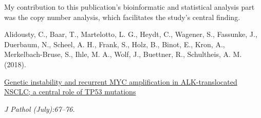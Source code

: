 \enlargethispage{\baselineskip}

\vfill
\noindent My contribution to this publication's bioinformatic and statistical
analysis part was the copy number analysis, which facilitates the study's
central finding.\nopagebreak
\medskip
\begin{tcolorbox}[
  boxrule=0pt, leftrule=1pt, colframe=s-blue, colback=white, sharp corners=all]%
  \raggedright
  Alidousty, C., Baar, T., Martelotto, L. G., Heydt, C., Wagener, S.,
  Fassunke, J., Duerbaum, N., Scheel, A. H., Frank, S., Holz, B., Binot, E.,
  Kron, A., Merkelbach-Bruse, S., Ihle, M. A., Wolf, J., Buettner, R.,
  Schultheis, A. M. (2018).
  
  \smallskip
  \href{http://doi.wiley.com/10.1002/path.5110}
    {Genetic instability and recurrent MYC amplification in ALK-translocated
    NSCLC; a central role of TP53 mutations}

  \smallskip
  \textit{J Pathol (July):67–76.}
\end{tcolorbox}


% 
% 